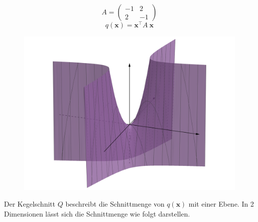 \begin{figure}[h]
    \centering
    \begin{minipage}{0.32\textwidth}
        \centering
        \begin{equation*}
            A = \begin{pmatrix} -1 & 2 \\ 2 & -1 \end{pmatrix}
        \end{equation*}
        \begin{equation*}
            q(\mathbf{x}) = \mathbf{x}^\top A \  \mathbf{x} 
        \end{equation*}
    \end{minipage}
    \begin{minipage}{0.45\textwidth}
        \centering
        \includegraphics[width=\textwidth]{media/hauptachsen_01.png}
    \end{minipage}
\end{figure}

Der Kegelschnitt \( Q \) beschreibt die Schnittmenge von \( q(\mathbf{x}) \) mit einer Ebene. In 2 Dimensionen lässt sich die Schnittmenge wie folgt darstellen. 

